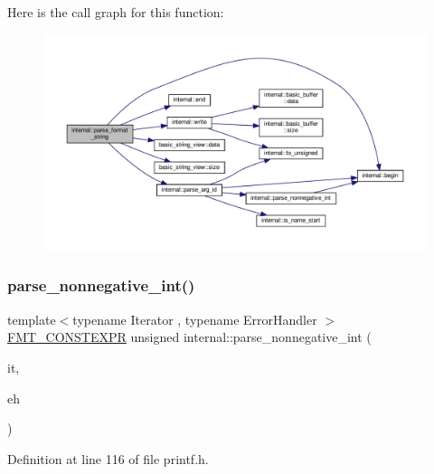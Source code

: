 Here is the call graph for this function\+:
\nopagebreak
\begin{figure}[H]
\begin{center}
\leavevmode
\includegraphics[width=350pt]{namespaceinternal_a47fffd25c13670b8e2eb6559caeef974_cgraph}
\end{center}
\end{figure}
\mbox{\label{namespaceinternal_a869c63300bb6636a767d8f3ba6507575}} 
\subsubsection{\texorpdfstring{parse\+\_\+nonnegative\+\_\+int()}{parse\_nonnegative\_int()}\hspace{0.1cm}{\footnotesize\ttfamily [1/2]}}
{\footnotesize\ttfamily template$<$typename Iterator , typename Error\+Handler $>$ \\
\hyperlink{core_8h_a69201cb276383873487bf68b4ef8b4cd}{F\+M\+T\+\_\+\+C\+O\+N\+S\+T\+E\+X\+PR} unsigned internal\+::parse\+\_\+nonnegative\+\_\+int (\begin{DoxyParamCaption}\item[{Iterator \&}]{it,  }\item[{Error\+Handler \&\&}]{eh }\end{DoxyParamCaption})}



Definition at line 116 of file printf.\+h.

\mbox{\label{namespaceinternal_af621000934cb16d73595619aebb0a35a}} 
